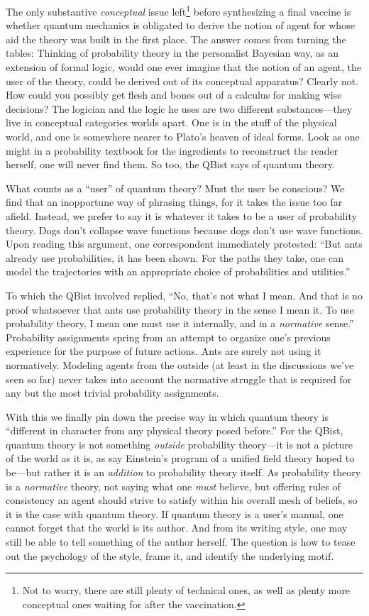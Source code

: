 \documentclass[aps,pra,superscriptaddress,10pt,tightenlines,twocolumn,nofootinbib]{revtex4}
\begin{document}
The only substantive {\it conceptual\/} issue left\footnote{Not to worry, there are still plenty of technical ones,  as well as plenty more conceptual ones waiting for after the vaccination.} before synthesizing a final vaccine is whether quantum mechanics is obligated to derive the notion of agent for whose aid the theory was built in the first place.  The answer comes from turning the tables:  Thinking of probability theory in the personalist Bayesian way, as an extension of formal logic, would one ever imagine that the notion of an agent, the user of the theory, could be derived out of its conceptual apparatus?  Clearly not.  How could you possibly get flesh and bones out of a calculus for making wise decisions?  The logician and the logic he uses are two different substances---they live in conceptual categories worlds apart.  One is in the stuff of the physical world, and one is somewhere nearer to Plato's heaven of ideal forms.  Look as one might in a probability textbook for the ingredients to reconstruct the reader herself, one will never find them.  So too, the QBist says of quantum theory.

What counts as a ``user'' of quantum theory? Must the user be
conscious? We find that an inopportune way of phrasing things, for it
takes the issue too far afield. Instead, we prefer to say it is
whatever it takes to be a user of probability theory. Dogs don't
collapse wave functions because dogs don't use wave functions. Upon
reading this argument, one correspondent immediately protested: ``But
ants already use probabilities, it has been shown. For the paths they
take, one can model the trajectories with an appropriate choice of
probabilities and utilities.''

To which the QBist involved replied, ``No, that's not what I mean. And that is
no proof whatsoever that ants use probability theory in the sense I mean
it. To use probability theory, I mean one must use it internally, and in a
{\it normative\/} sense.'' Probability assignments spring from
an attempt to organize one's previous experience for the purpose of future
actions. Ants are surely not using it normatively.  Modeling agents from the
outside (at least in the discussions we've seen so far) never takes into account
the normative struggle that is required for any but the most trivial
probability assignments.

With this we finally pin down the precise way in which quantum theory is ``different in character from any physical theory posed before.''
For the QBist, quantum theory is not something {\it outside\/} probability theory---it is not a picture of the world as it is, as say Einstein's program of a unified field theory hoped to be---but rather it is an {\it addition\/} to probability theory itself.  As probability theory is a {\it normative\/} theory, not saying what one {\it must\/} believe, but offering rules of consistency an agent should strive to satisfy within his overall mesh of beliefs, so it is the case with quantum theory.  If quantum theory is a user's manual, one cannot forget that the world is its author.  And from its writing style, one may still be able to tell something of the author herself.  The question is how to tease out the psychology of the style, frame it, and identify the underlying motif.
\end{document}
